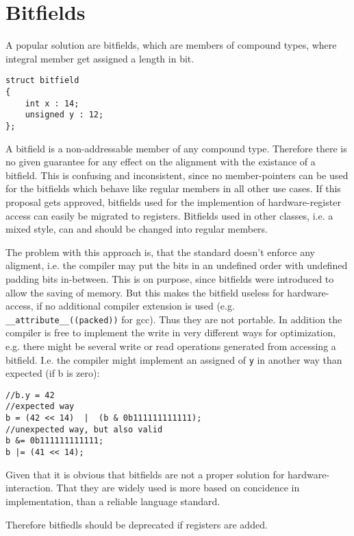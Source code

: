 \documentclass{report}
\begin{document}
\section{Bitfields}
A popular solution are bitfields, which are members of compound types, where integral member get assigned a length in bit.
\begin{lstlisting}
struct bitfield
{
    int x : 14;
    unsigned y : 12;
};
\end{lstlisting}
A bitfield is a non-addressable member of any compound type.  Therefore there is no given guarantee for any effect on the alignment with the existance of a bitfield.
This is confusing and inconsistent, since no member-pointers can be used for the bitfields which behave like regular members in all other use cases. 
If this proposal gets approved, bitfields used for the implemention of hardware-register access can easily be migrated to registers. Bitfields used in
other classes, i.e. a mixed style, can and should be changed into regular members.

The problem with this approach is, that the standard doesn't enforce any aligment, i.e. the compiler may put the bits in an undefined order with undefined padding bits in-between.
This is on purpose, since bitfields were introduced to allow the saving of memory. But this makes the bitfield useless for hardware-access, if no additional compiler extension is used (e.g. \lstinline{__attribute__((packed))} for gcc). Thus they are not portable. In addition the compiler is free to implement the write in very different ways for optimization, e.g. there might be several write or read operations generated from accessing a bitfield. I.e. the compiler might implement an assigned of \lstinline {y} in another way than expected (if b is zero):

\begin{lstlisting}
//b.y = 42
//expected way
b = (42 << 14)  |  (b & 0b111111111111);
//unexpected way, but also valid
b &= 0b111111111111;
b |= (41 << 14);
\end{lstlisting}

Given that it is obvious that bitfields are not a proper solution for hardware-interaction. That they are widely used is more based on concidence in implementation, than a reliable language standard.

Therefore bitfiedls should be deprecated if registers are added.
\newpage
\end{document}
